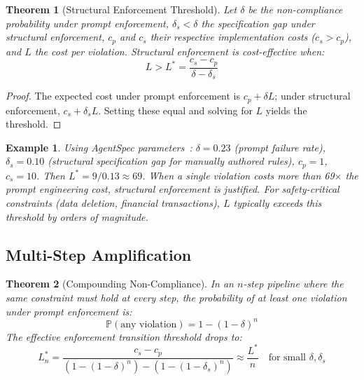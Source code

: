 \documentclass[11pt, a4paper, logo, copyright]{googledeepmind}
\newtheorem{theorem}{Theorem}[section]
\newtheorem{example}{Example}[section]
\newcommand{\Prob}{\mathbb{P}}
\begin{document}
\begin{theorem}[Structural Enforcement Threshold]
\label{thm:threshold}
Let $\delta$ be the non-compliance probability under prompt enforcement, $\delta_s < \delta$ the specification gap under structural enforcement, $c_p$ and $c_s$ their respective implementation costs ($c_s > c_p$), and $L$ the cost per violation.
Structural enforcement is cost-effective when:
\begin{equation}
L > L^* = \frac{c_s - c_p}{\delta - \delta_s}
\end{equation}
\end{theorem}

\begin{proof}
The expected cost under prompt enforcement is $c_p + \delta L$; under structural enforcement, $c_s + \delta_s L$.
Setting these equal and solving for $L$ yields the threshold.
\end{proof}

\begin{example}
Using AgentSpec parameters~\citep{wang2026agentspec}: $\delta = 0.23$ (prompt failure rate), $\delta_s = 0.10$ (structural specification gap for manually authored rules), $c_p = 1$, $c_s = 10$.
Then $L^* = 9/0.13 \approx 69$.
When a single violation costs more than 69$\times$ the prompt engineering cost, structural enforcement is justified.
For safety-critical constraints (data deletion, financial transactions), $L$ typically exceeds this threshold by orders of magnitude.
\end{example}

\subsection{Multi-Step Amplification}

\begin{theorem}[Compounding Non-Compliance]
\label{thm:compounding}
In an $n$-step pipeline where the same constraint must hold at every step, the probability of at least one violation under prompt enforcement is:
\begin{equation}
\Prob(\text{any violation}) = 1 - (1 - \delta)^n
\end{equation}
The effective enforcement transition threshold drops to:
\begin{equation}
L_n^* = \frac{c_s - c_p}{(1 - (1-\delta)^n) - (1 - (1-\delta_s)^n)} \approx \frac{L^*}{n} \quad \text{for small } \delta, \delta_s
\end{equation}
\end{theorem}
\end{document}
